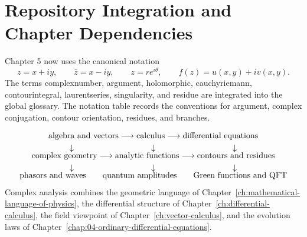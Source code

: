 \section{Repository Integration and Chapter Dependencies}
\label{sec:ch5-integration}

Chapter 5 now uses the canonical notation
\[
z=x+iy,\qquad \bar z=x-iy,\qquad z=re^{i\theta},\qquad f(z)=u(x,y)+iv(x,y).
\]
The terms \gls{complexnumber}, \gls{argument}, \gls{holomorphic}, \gls{cauchyriemann}, \gls{contourintegral}, \gls{laurentseries}, \gls{singularity}, and \gls{residue} are integrated into the global glossary. The notation table records the conventions for argument, complex conjugation, contour orientation, residues, and branches.

\begin{physicalbox}
\[
\begin{array}{c}
\text{algebra and vectors}\longrightarrow\text{calculus}\longrightarrow\text{differential equations}\\[1mm]
\downarrow\hspace{33mm}\downarrow\hspace{33mm}\downarrow\\[-1mm]
\text{complex geometry}\longrightarrow\text{analytic functions}\longrightarrow\text{contours and residues}\\[1mm]
\downarrow\hspace{33mm}\downarrow\hspace{33mm}\downarrow\\[-1mm]
\text{phasors and waves}\qquad\text{quantum amplitudes}\qquad\text{Green functions and QFT}
\end{array}
\]
Complex analysis combines the geometric language of Chapter~\ref{ch:mathematical-language-of-physics}, the differential structure of Chapter~\ref{ch:differential-calculus}, the field viewpoint of Chapter~\ref{ch:vector-calculus}, and the evolution laws of Chapter~\ref{chap:04-ordinary-differential-equations}.
\end{physicalbox}

